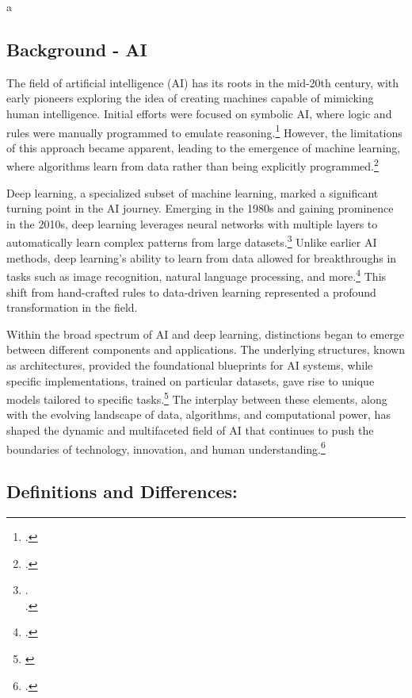 a\documentclass{article}[10pt]
\begin{document}
\subsection{Background - AI}

The field of artificial intelligence (AI) has its roots in the mid-20th century, with early pioneers exploring the idea of creating machines capable of mimicking human intelligence. Initial efforts were focused on symbolic AI, where logic and rules were manually programmed to emulate reasoning.\footnote{
    \cite{russell2010artificial}.}
However, the limitations of this approach became apparent, leading to the emergence of machine learning, where algorithms learn from data rather than being explicitly programmed.\footnote{
    \cite{mccorduck2004machines}.}\par

Deep learning, a specialized subset of machine learning, marked a significant turning point in the AI journey. 
Emerging in the 1980s and gaining prominence in the 2010s, deep learning leverages neural networks with multiple layers to automatically learn complex patterns from large datasets.\footnote{
    \cite{lecun2015deep}.\\
    \indent\indent \cite{goodfellow2016deep}.}
Unlike earlier AI methods, deep learning's ability to learn from data allowed for breakthroughs in tasks such as image recognition, natural language processing, and more.\footnote{
    \cite{krizhevsky2012imagenet}.}
This shift from hand-crafted rules to data-driven learning represented a profound transformation in the field.\par

Within the broad spectrum of AI and deep learning, distinctions began to emerge between different components and applications. The underlying structures, known as architectures, provided the foundational blueprints for AI systems, while specific implementations, trained on particular datasets, gave rise to unique models tailored to specific tasks.\footnote{
    \cite{goodfellow2016deep}}
The interplay between these elements, along with the evolving landscape of data, algorithms, and computational power, has shaped the dynamic and multifaceted field of AI that continues to push the boundaries of technology, innovation, and human understanding.\footnote{
    \cite{jordan2015machine}.}

\subsection{Definitions and Differences:}
\end{document}
